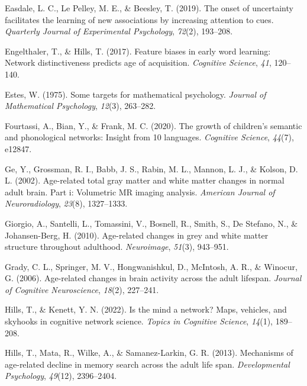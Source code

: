 \documentclass[
  man,floatsintext]{apa6}
\newlength{\cslhangindent}
\newlength{\cslentryspacingunit} %
\newenvironment{CSLReferences}[2] %
 {%
  \setlength{\parindent}{0pt}
  \ifodd #1
  \let\oldpar\par
  \def\par{\hangindent=\cslhangindent\oldpar}
  \fi
  \setlength{\parskip}{#2\cslentryspacingunit}
 }%
 {}
\begin{document}
\begin{CSLReferences}{1}{0}
\leavevmode{}%
Easdale, L. C., Le Pelley, M. E., \& Beesley, T. (2019). The onset of uncertainty facilitates the learning of new associations by increasing attention to cues. \emph{Quarterly Journal of Experimental Psychology}, \emph{72}(2), 193--208.

\leavevmode{}%
Engelthaler, T., \& Hills, T. (2017). Feature biases in early word learning: Network distinctiveness predicts age of acquisition. \emph{Cognitive Science}, \emph{41}, 120--140.

\leavevmode{}%
Estes, W. (1975). Some targets for mathematical psychology. \emph{Journal of Mathematical Psychology}, \emph{12}(3), 263--282.

\leavevmode{}%
Fourtassi, A., Bian, Y., \& Frank, M. C. (2020). The growth of children's semantic and phonological networks: Insight from 10 languages. \emph{Cognitive Science}, \emph{44}(7), e12847.

\leavevmode{}%
Ge, Y., Grossman, R. I., Babb, J. S., Rabin, M. L., Mannon, L. J., \& Kolson, D. L. (2002). Age-related total gray matter and white matter changes in normal adult brain. Part i: Volumetric MR imaging analysis. \emph{American Journal of Neuroradiology}, \emph{23}(8), 1327--1333.

\leavevmode{}%
Giorgio, A., Santelli, L., Tomassini, V., Bosnell, R., Smith, S., De Stefano, N., \& Johansen-Berg, H. (2010). Age-related changes in grey and white matter structure throughout adulthood. \emph{Neuroimage}, \emph{51}(3), 943--951.

\leavevmode{}%
Grady, C. L., Springer, M. V., Hongwanishkul, D., McIntosh, A. R., \& Winocur, G. (2006). Age-related changes in brain activity across the adult lifespan. \emph{Journal of Cognitive Neuroscience}, \emph{18}(2), 227--241.

\leavevmode{}%
Hills, T., \& Kenett, Y. N. (2022). Is the mind a network? Maps, vehicles, and skyhooks in cognitive network science. \emph{Topics in Cognitive Science}, \emph{14}(1), 189--208.

\leavevmode{}%
Hills, T., Mata, R., Wilke, A., \& Samanez-Larkin, G. R. (2013). Mechanisms of age-related decline in memory search across the adult life span. \emph{Developmental Psychology}, \emph{49}(12), 2396--2404.


\end{CSLReferences}
\end{document}
